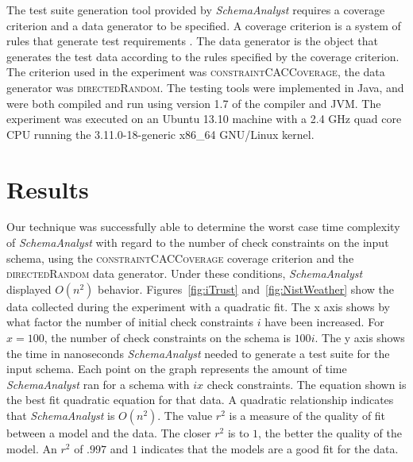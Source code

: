 \documentclass{sig-alternate}
\begin{document}
The test suite generation tool provided by \textit{SchemaAnalyst}
requires a coverage criterion and a data generator to be specified. A
coverage criterion is a system of rules that generate test requirements
\cite{Ammann:Testing}. The data generator is the object that generates
the test data according to the rules specified by the coverage
criterion. The criterion used in the experiment was
\textsc{constraintCACCoverage}, 
the data generator was \textsc{directedRandom}. The
testing tools were implemented in Java, and were both compiled and run using
version 1.7 of the compiler and JVM. The experiment was executed on an Ubuntu 13.10 machine with a 2.4
GHz quad core CPU running the 3.11.0-18-generic x86\_64 GNU/Linux
kernel.

\section{Results}
Our technique was successfully able to determine the worst case time
complexity of \textit{SchemaAnalyst} with regard to the number of check
constraints on the input schema, using the
\textsc{constraintCACCoverage} coverage criterion and the
\textsc{directedRandom} data generator. Under these conditions, 
\textit{SchemaAnalyst} displayed $O(n^2)$ behavior. Figures~\ref{fig:iTrust} 
and~\ref{fig:NistWeather} show the data collected during the experiment with a
quadratic fit. The x axis shows by what factor the number of initial
check constraints $i$ have been increased. For $x = 100$, the number of check
constraints on the schema is $100i$. The y axis shows the time in
nanoseconds \textit{SchemaAnalyst} needed to generate a test suite for
the input schema. Each point on the graph represents the amount of time
\textit{SchemaAnalyst} ran for a schema with $ix$ check constraints.
The equation shown is the best fit quadratic equation for that data.  A
quadratic relationship indicates that \textit{SchemaAnalyst} is
$O(n^2)$.  The value $r^2$ is a measure of the quality of fit between a model and
the data. The closer $r^2$ is to $1$, the better the quality of the
model.  An $r^2$ of $.997$ and $1$ indicates that the models are a good fit for
the data.
\end{document}
